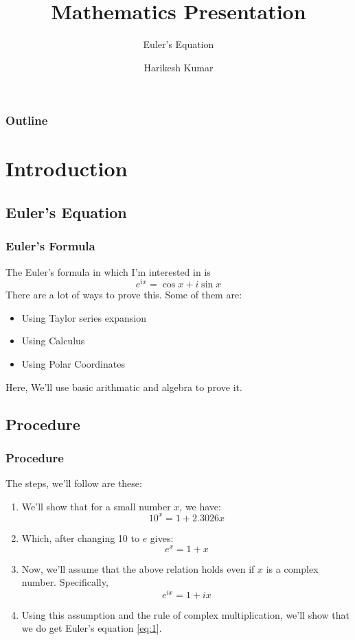 \documentclass{beamer}
\title{Mathematics Presentation}
\subtitle{Euler's Equation}
\institute[IITD]{Indian Institute of Technology, Delhi}
\author{Harikesh Kumar}
\begin{document}
\maketitle
\begin{frame}
    \frametitle{Outline}
    \tableofcontents
\end{frame}
\label{Intro}
\section{Introduction}
\subsection{Euler's Equation}
\begin{frame}
    \frametitle{Euler's Formula}
    The Euler's formula in which I'm interested in is
    \begin{equation}
        \label{eq:1}
        e^{ix} = \cos{x} + i\sin{x}
    \end{equation}
    There are a lot of ways to prove this. Some of them are:
    \begin{itemize}
        \color{blue}
        \item <2-> Using Taylor series expansion
        \item <3-> Using Calculus
        \item <4-> Using Polar Coordinates
    \end{itemize}
     Here, We'll use basic arithmatic and algebra to prove it.
\end{frame}
\subsection{Procedure}
\begin{frame}
    \frametitle{Procedure}
    The steps, we'll follow are these:
    \begin{enumerate}
        \item <2->  We'll show that for a small number $x$, we have: $$ 10^x = 1 + 2.3026x$$
        \item <3-> Which, after changing 10 to $e$ gives: $$ e^x = 1+x$$
        \item <4-> Now, we'll assume that the above relation holds even if $x$ is a complex number. Specifically, $$e^{ix} = 1+ix$$
        \item <5-> Using this assumption and the rule of complex multiplication, we'll show that we do get Euler's equation \ref{eq:1}.
    \end{enumerate}
\end{frame}
\end{document}
